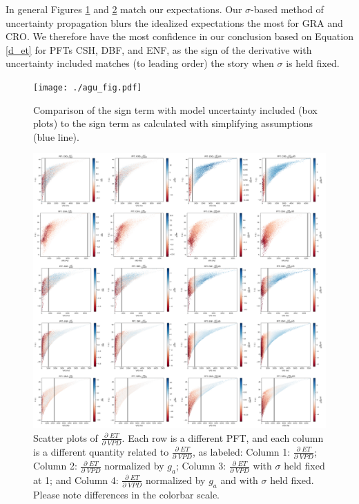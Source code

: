 \documentclass[draft,linenumbers]{agujournal}
\begin{document}
In general Figures  \ref{agu_fig} and \ref{real} match our expectations. Our $\sigma$-based method of uncertainty propagation blurs the idealized expectations the most for GRA and CRO. We therefore have the most confidence in our conclusion based on Equation \ref{d_et} for PFTs CSH, DBF, and ENF, as the sign of the derivative with uncertainty included matches (to leading order) the story when $\sigma$ is held fixed.

\begin{figure}[h]
\centering
\texttt{[image: ./agu\_fig.pdf]}
\caption{Comparison of the sign term with model uncertainty included (box plots) to the sign term as calculated with simplifying assumptions (blue line).}
\label{agu_fig}
\end{figure}


\begin{figure}[h]
\centering
\centerline{\includegraphics[width=1.4\textwidth]{./fig06.png}}
\caption{Scatter plots of $\frac{\partial \; ET}{\partial \; VPD}$. Each row is a different PFT, and each column is a different quantity related to $\frac{\partial \; ET}{\partial \; VPD}$, as labeled: Column 1: $\frac{\partial \; ET}{\partial \; VPD}$; Column 2: $\frac{\partial \; ET}{\partial \; VPD}$ normalized by $g_a$; Column 3: $\frac{\partial \; ET}{\partial \; VPD}$ with $\sigma$ held fixed at 1; and Column 4: $\frac{\partial \; ET}{\partial \; VPD}$ normalized by $g_a$ and with $\sigma$ held fixed. Please note differences in the colorbar scale.}
\label{real}
\end{figure}
\end{document}
